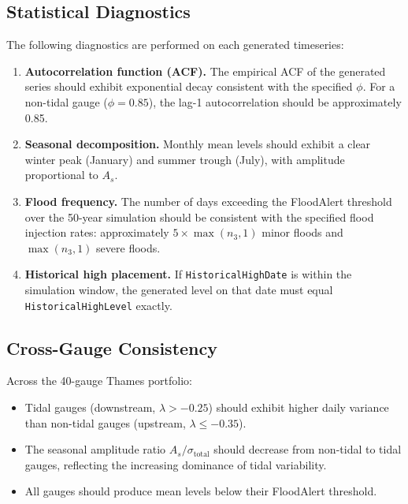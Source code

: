 \documentclass[11pt,a4paper]{article}
\begin{document}
\mkmvalidation

\subsection{Statistical Diagnostics}

The following diagnostics are performed on each generated timeseries:

\begin{enumerate}[nosep]
    \item \textbf{Autocorrelation function (ACF).} The empirical ACF of the generated
          series should exhibit exponential decay consistent with the specified $\phi$.
          For a non-tidal gauge ($\phi = 0.85$), the lag-1 autocorrelation should be
          approximately 0.85.
    \item \textbf{Seasonal decomposition.} Monthly mean levels should exhibit a clear
          winter peak (January) and summer trough (July), with amplitude proportional to
          $A_s$.
    \item \textbf{Flood frequency.} The number of days exceeding the FloodAlert threshold
          over the 50-year simulation should be consistent with the specified flood
          injection rates: approximately $5 \times \max(n_3, 1)$ minor floods and
          $\max(n_3, 1)$ severe floods.
    \item \textbf{Historical high placement.} If \texttt{HistoricalHighDate} is within the
          simulation window, the generated level on that date must equal
          \texttt{HistoricalHighLevel} exactly.
\end{enumerate}

\subsection{Cross-Gauge Consistency}

Across the 40-gauge Thames portfolio:
\begin{itemize}[nosep]
    \item Tidal gauges (downstream, $\lambda > -0.25$) should exhibit higher daily
          variance than non-tidal gauges (upstream, $\lambda \le -0.35$).
    \item The seasonal amplitude ratio $A_s / \sigma_{\text{total}}$ should decrease
          from non-tidal to tidal gauges, reflecting the increasing dominance of
          tidal variability.
    \item All gauges should produce mean levels below their FloodAlert threshold.
\end{itemize}
\end{document}
